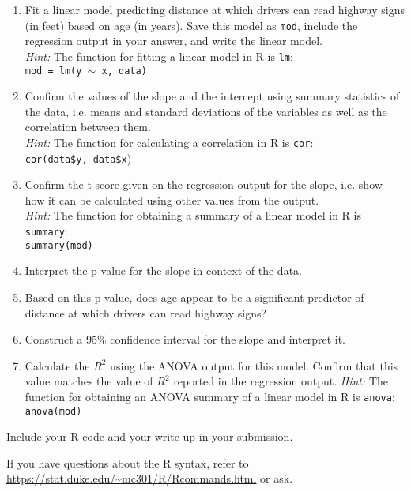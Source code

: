 \documentclass[11pt]{article}
\begin{document}
\begin{enumerate}
\item Fit a linear model predicting distance at which drivers can read highway signs (in feet) based on age (in years). Save this model as \texttt{mod}, include the regression output in your answer, and write the linear model. \\
\textit{Hint:} The function for fitting a linear model in R is \texttt{lm}: \\
\texttt{mod = lm(y $\sim$ x, data)}
\item Confirm the values of the slope and the intercept using summary statistics of the data, i.e. means and standard deviations of the variables as well as the correlation between them. \\
\textit{Hint:} The function for calculating a correlation in R is \texttt{cor}: \\
\texttt{cor(data\$y, data\$x})
\item Confirm the t-score given on the regression output for the slope, i.e. show how it can be calculated using other values from the output. \\
\textit{Hint:} The function for obtaining a summary of a linear model in R is \texttt{summary}: \\\texttt{summary(mod)}
\item Interpret the p-value for the slope in context of the data.
\item Based on this p-value, does age appear to be a significant predictor of distance at which drivers can read highway signs?
\item Construct a 95\% confidence interval for the slope and interpret it.
\item Calculate the $R^2$ using the ANOVA output for this model. Confirm that this value matches the value of $R^2$ reported in the regression output.
\textit{Hint:} The function for obtaining an ANOVA summary of a linear model in R is \texttt{anova}: \\\texttt{anova(mod)}
 \end{enumerate}
 
Include your R code and your write up in your submission. 

If you have questions about the R syntax, refer to \url{https://stat.duke.edu/~mc301/R/Rcommands.html} or ask.
\end{document}
